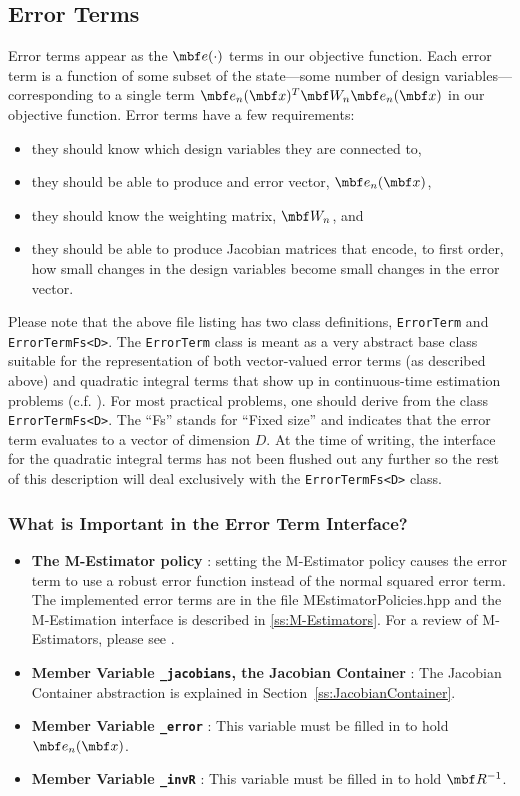 \documentclass[11pt,a4,oneside]{article}
\newcommand{\txt}[1]{{\footnotesize\texttt{#1}}}
\newcommand{\listcpp}[2]{}
\begin{document}
\subsection{Error Terms \label{ss:ErrorTerm}}
Error terms appear as the $\mbf e(\cdot)$ terms in our objective function. Each error term is a function of some subset of the state---some number of design variables---corresponding to a single term $\mbf e_{n}(\mbf x)^T \mbf W_n \mbf e_n(\mbf x)$ in our objective function. Error terms have a few requirements:
\begin{itemize}
\item they should know which design variables they are connected to,
\item they should be able to produce and error vector, $\mbf e_n(\mbf x)$, 
\item they should know the weighting matrix, $\mbf W_n$, and
\item they should be able to produce Jacobian matrices that encode, to first order, how small changes in the design variables become small changes in the error vector.  
\end{itemize}
\listcpp{ErrorTerm.hpp}{../../aslam_backend/include/aslam/backend/ErrorTerm.hpp}

Please note that the above file listing has two class definitions, \txt{ErrorTerm} and \txt{ErrorTermFs<D>}. The \txt{ErrorTerm} class is meant as a very abstract base class suitable for the representation of both vector-valued error terms (as described above) and quadratic integral terms that show up in continuous-time estimation problems (c.f. \citet{Tong1200,Furgale1200}). For most practical problems, one should derive from the class \txt{ErrorTermFs<D>}. The ``Fs'' stands for ``Fixed size'' and indicates that the error term evaluates to a vector of dimension $D$. At the time of writing, the interface for the quadratic integral terms has not been flushed out any further so the rest of this description will deal exclusively with the \txt{ErrorTermFs<D>} class. 

\subsubsection{What is Important in the Error Term Interface?}
\begin{itemize}
\item {\bf The M-Estimator policy} : setting the M-Estimator policy causes the error term to use a robust error function instead of the normal squared error term. The implemented error terms are in the file {MEstimatorPolicies.hpp} and the M-Estimation interface is described in \ref{ss:M-Estimators}. For a review of M-Estimators, please see \citet{Zhang9700}.
\item {\bf Member Variable \txt{\_jacobians}, the Jacobian Container} : The Jacobian Container abstraction is explained in Section~\ref{ss:JacobianContainer}.
\item {\bf Member Variable \txt{\_error}} : This variable must be filled in to hold $\mbf e_n(\mbf x)$.
\item {\bf Member Variable \txt{\_invR}} : This variable must be filled in to hold $\mbf R^{-1}$.
\end{itemize}
\end{document}
